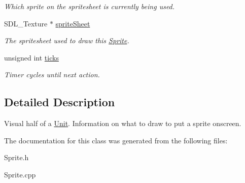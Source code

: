 \begin{DoxyCompactItemize}
\begin{DoxyCompactList}\small\item\em Which sprite on the spritesheet is currently being used. \end{DoxyCompactList}\item 
S\+D\+L\+\_\+\+Texture $\ast$ \hyperlink{class_sprite_aec7102885a3ca3fdd5124f8677135013}{sprite\+Sheet}\hypertarget{class_sprite_aec7102885a3ca3fdd5124f8677135013}{}\label{class_sprite_aec7102885a3ca3fdd5124f8677135013}

\begin{DoxyCompactList}\small\item\em The spritesheet used to draw this \hyperlink{class_sprite}{Sprite}. \end{DoxyCompactList}\item 
unsigned int \hyperlink{class_sprite_ac22dd37869ae96df32fd1fdba05e96d4}{ticks}\hypertarget{class_sprite_ac22dd37869ae96df32fd1fdba05e96d4}{}\label{class_sprite_ac22dd37869ae96df32fd1fdba05e96d4}

\begin{DoxyCompactList}\small\item\em Timer cycles until next action. \end{DoxyCompactList}\end{DoxyCompactItemize}


\subsection{Detailed Description}
Visual half of a \hyperlink{class_unit}{Unit}. Information on what to draw to put a sprite onscreen. 

The documentation for this class was generated from the following files\+:\begin{DoxyCompactItemize}
\item 
Sprite.\+h\item 
Sprite.\+cpp\end{DoxyCompactItemize}

